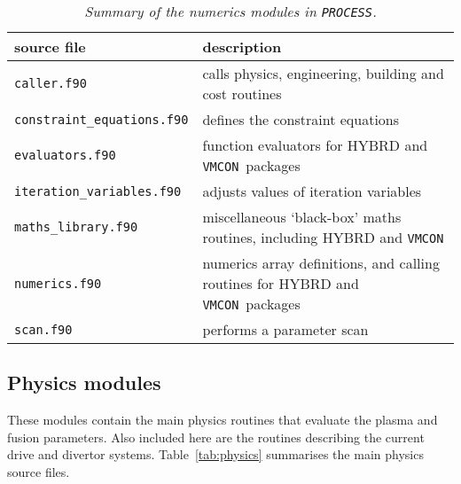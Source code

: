 \documentclass[11pt,a4paper]{report}
\newcommand{\process}{\mbox{\texttt{PROCESS}}}
\newcommand{\vmcon}{\mbox{\texttt{VMCON}}}
\begin{document}
\begin{table}[tbph]
\footnotesize
\begin{center}
\begin{tabular}{||l||l||} \hline
source file   & description \\ \hline
\texttt{caller.f90} & calls physics, engineering, building and cost routines \\
\texttt{constraint\_equations.f90} & defines the constraint equations \\
\texttt{evaluators.f90} & function evaluators for HYBRD and \vmcon\ packages \\
\texttt{iteration\_variables.f90} & adjusts values of iteration variables \\
\texttt{maths\_library.f90} & miscellaneous `black-box' maths routines,
including HYBRD and \vmcon \\
\texttt{numerics.f90} & numerics array definitions, and calling routines for
HYBRD and \vmcon\ packages \\
\texttt{scan.f90} & performs a parameter scan \\
\hline
\end{tabular}
\end{center}
\caption[Summary of numerics modules]
{\label{tab:numerics}
  \textit{Summary of the numerics modules in \process.}
}
\end{table}

\subsection{Physics modules}

These modules contain the main physics routines that evaluate the plasma and
fusion parameters. Also included here are the routines describing the current
drive and divertor systems. Table~\ref{tab:physics} summarises the main physics
source files.
\end{document}
